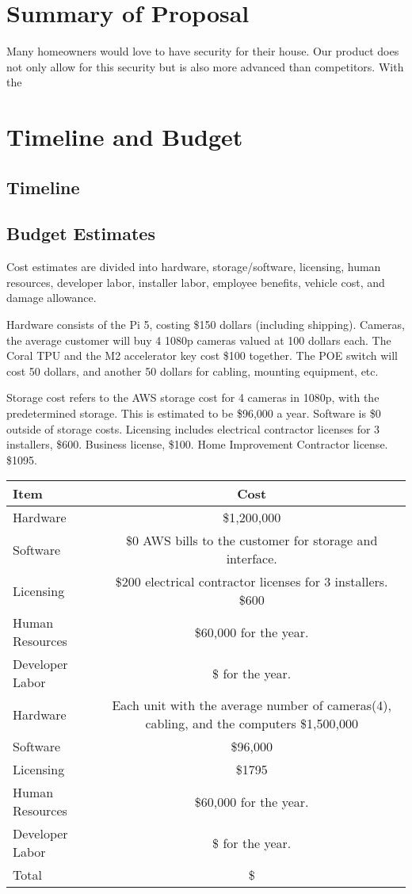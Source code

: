 \documentclass{report}
\begin{document}
\chapter{Summary of Proposal}
Many homeowners would love to have security for their house. 
Our product does not only allow for this security but is also more advanced than competitors.
With the 


\chapter{Timeline and Budget}
\section{Timeline}

\section{Budget Estimates}
Cost estimates are divided into hardware, 
storage/software, licensing, human resources,
developer labor, installer labor, employee benefits, 
vehicle cost, and damage allowance.

Hardware consists of the Pi 5, costing \$150 dollars (including shipping). Cameras, 
the average customer will buy 4 1080p cameras valued at 100 dollars each. 
The Coral TPU and the M2 accelerator key cost \$100 together.
The POE switch will cost 50 dollars, and another 50 dollars for cabling, mounting equipment, etc.

Storage cost refers to the AWS storage cost for 4 cameras in 1080p, with the predetermined storage. This is estimated to be \$96,000 a year.
Software is \$0 outside of storage costs.
Licensing includes electrical contractor licenses for 3 installers, \$600. Business license, \$100. 
Home Improvement Contractor license. \$1095.
\begin{tabular}{|l|c|}
\hline
Item & Cost \\
\hline
Hardware & \$1,200,000 \\
Software & \$0 AWS bills to the customer for storage and interface. \\
Licensing & \$200 electrical contractor licenses for 3 installers. \$600 \\
Human Resources & \$60,000 for the year. \\
Developer Labor & \$ for the year. \\
Hardware & Each unit with the average number of cameras(4),
cabling, and the computers \$1,500,000\\
Software & \$96,000\\
Licensing & \$1795 \\
Human Resources & \$60,000 for the year.\\
Developer Labor & \$ for the year.\\
\hline
Total & \$ \\
\hline
\end{tabular}
\end{document}
